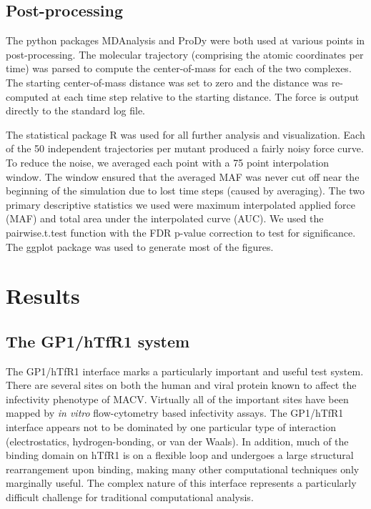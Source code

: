 \documentclass[12pt]{article}
\begin{document}
\subsection*{Post-processing}

The python packages MDAnalysis \citep{Agrawal2011} and ProDy \citep{Bakan2011} were both used at various points in post-processing. The molecular trajectory (comprising the atomic coordinates per time) was parsed to compute the center-of-mass for each of the two complexes. The starting center-of-mass distance was set to zero and the distance was re-computed at each time step relative to the starting distance. The force is output directly to the standard log file.

The statistical package R was used for all further analysis and visualization. Each of the 50 independent trajectories per mutant produced a fairly noisy force curve. To reduce the noise, we averaged each point with a 75 point interpolation window. The window ensured that the averaged MAF was never cut off near the beginning of the simulation due to lost time steps (caused by averaging). The two primary descriptive statistics we used were maximum interpolated applied force (MAF) and total area under the interpolated curve (AUC). We used the pairwise.t.test function with the FDR p-value correction to test for significance. The ggplot \citep{ggplot} package was used to generate most of the figures. 

\section*{Results}

\subsection*{The GP1/hTfR1 system}

The GP1/hTfR1 interface marks a particularly important and useful test system. There are several sites on both the human and viral protein known to affect the infectivity phenotype of MACV. Virtually all of the important sites have been mapped by \textit{in vitro} flow-cytometry based infectivity assays. The GP1/hTfR1 interface appears not to be dominated by one particular type of interaction (electrostatics, hydrogen-bonding, or van der Waals). In addition, much of the binding domain on hTfR1 is on a flexible loop and undergoes a large structural rearrangement upon binding, making many other computational techniques \citep{Grant2011,Kortemme2004} only marginally useful. The complex nature of this interface represents a particularly difficult challenge for traditional computational analysis. 
\end{document}
